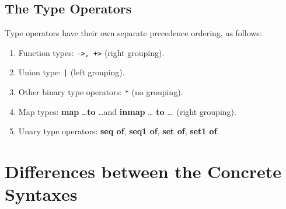 \documentclass{overturerepchap}
\newcommand{\nonstandard}[1]{}
\newcommand{\keyw}[1]{{\bf\ttfamily #1}}
\begin{document}
{\section{The Type Operators}\label{preceedence}

Type operators have their own separate precedence ordering, as follows:
\begin{enumerate}
\item Function types: {\tt ->, +>} (right grouping).

\item Union type: {\tt |} (left grouping).

\item Other binary type operators: \verb+*+ (no grouping).

\item Map types: \keyw{map} \ldots \keyw{to} \ldots and \keyw{inmap} \ldots
  \keyw{to} \ldots\ (right grouping).\nonstandard{0}

\item Unary type operators: \keyw{seq of}, \keyw{seq1 of}, \keyw{set of}, \keyw{set1 of}.
\end{enumerate}

\chapter{Differences between the Concrete Syntaxes}\label{sec:diff}

}
\end{document}

